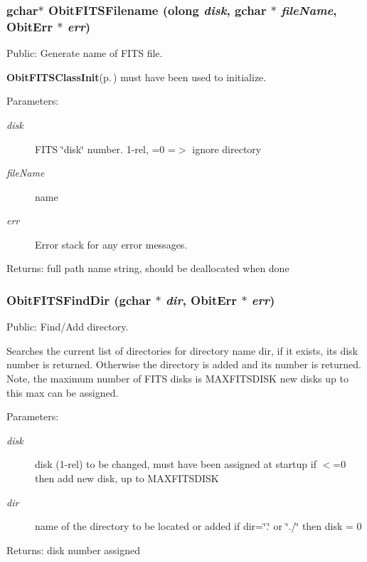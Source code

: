 \subsubsection{\setlength{\rightskip}{0pt plus 5cm}gchar$\ast$ Obit\-FITSFilename ({\bf olong} {\em disk}, gchar $\ast$ {\em file\-Name}, {\bf Obit\-Err} $\ast$ {\em err})}\label{ObitFITS_8h_a8}


Public: Generate name of FITS file. 

{\bf Obit\-FITSClass\-Init}{\rm (p.\,\pageref{ObitFITS_8c_a2})} must have been used to initialize. \begin{Desc}
\item[Parameters:]
\begin{description}
\item[{\em disk}]FITS \char`\"{}disk\char`\"{} number. 1-rel, =0 =$>$ ignore directory \item[{\em file\-Name}]name \item[{\em err}]Error stack for any error messages. \end{description}
\end{Desc}
\begin{Desc}
\item[Returns:]full path name string, should be deallocated when done \end{Desc}
\subsubsection{ Obit\-FITSFind\-Dir (gchar $\ast$ {\em dir}, {\bf Obit\-Err} $\ast$ {\em err})}\label{ObitFITS_8h_a7}


Public: Find/Add directory. 

Searches the current list of directories for directory name dir, if it exists, its disk number is returned. Otherwise the directory is added and its number is returned. Note, the maximum number of FITS disks is MAXFITSDISK new disks up to this max can be assigned. \begin{Desc}
\item[Parameters:]
\begin{description}
\item[{\em disk}]disk (1-rel) to be changed, must have been assigned at startup if $<$=0 then add new disk, up to MAXFITSDISK \item[{\em dir}]name of the directory to be located or added if dir=\char`\"{}.\char`\"{} or \char`\"{}./\char`\"{} then disk = 0 \end{description}
\end{Desc}
\begin{Desc}
\item[Returns:]disk number assigned \end{Desc}
